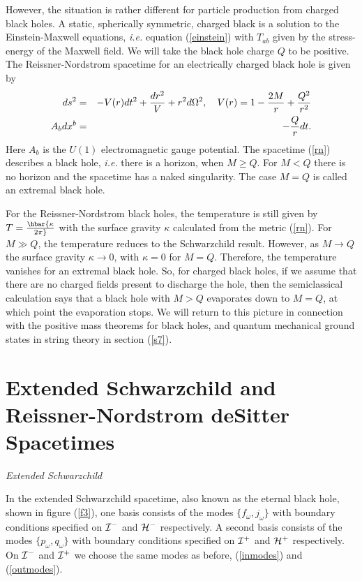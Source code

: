 \documentclass[12pt]{article}
\newcommand{\p}{\partial}
\def\bena{\begin{eqnarray}}
\def\eena{\end{eqnarray}}
\def\fh{{\cal H}^+}
\def\ph{{\cal H}^-}
\def\finf{{\cal I}^+}
\def\pinf{{\cal I}^-}
\def\f{f_{\omega}}
\def\p{p_{\omega}}
\def\q{q_{\omega}}
\def\j{j_{\omega}}
\begin{document}
However, the situation is rather different for particle production
from charged black holes. A static, spherically symmetric, charged black is a
solution to the Einstein-Maxwell equations, {\it i.e.} equation
(\ref{einstein}) with $T_{ab}$ given by the
stress-energy of the Maxwell field.
We will take the black hole
charge $Q$ to be positive.  The Reissner-Nordstrom spacetime for an
electrically charged
black hole is given by
%
\bena\label{rn} ds^2  &= &-V(r)dt^2 +{dr^2 \over V} +r^2 d\Omega ^2,
\quad V(r) = 1-{2M\over r} +{Q^2 \over r^2}  \\
A_b dx^b &=&-{Q\over r}dt .\eena
%
Here $A_b$ is the $U(1)$ electromagnetic gauge potential. The spacetime
(\ref{rn})  describes
a black hole, {\it i.e.} there is a horizon, when $M\ge Q$.  For $M<Q$
there is no
horizon and the spacetime has a naked singularity. The case $M=Q$
is called an extremal black hole.

For the Reissner-Nordstrom black holes, the temperature is still given by
$T=\hbar
{\kappa\over 2\pi}$ with the surface gravity $\kappa$ calculated from the
metric (\ref{rn}).
For $M\gg Q$, the
temperature reduces to the Schwarzchild result.  However, as $M\rightarrow
Q $ the surface
gravity  $\kappa\rightarrow 0$, with $\kappa =0$ for $M=Q$.
Therefore, the temperature vanishes for an extremal black hole. So, for
charged black holes, if we assume that
there are no charged fields present to discharge the hole, then the
semiclassical calculation says
that a black hole with $M>Q$ evaporates down to $M=Q$, at which point the
evaporation stops.
We will return to this picture in connection with the positive mass
theorems for black
holes, and quantum mechanical ground states in  string theory in section (\ref{s7}).

\section{Extended Schwarzchild and Reissner-Nordstrom deSitter Spacetimes}
\label{section6}

\vskip 0.1in\noindent
{\it Extended Schwarzchild}
\vskip 0.05in

In the extended Schwarzchild spacetime, also known as the eternal black hole,
shown in figure (\ref{f3}), one basis
consists of the modes $\{\f,\j\}$ with boundary conditions specified on
$\pinf$ and $\ph$ respectively.  A
second basis consists of the modes $\{ \p ,\q \}$ with boundary conditions
specified on
$\finf$ and $\fh$ respectively.  On $\pinf$ and $\finf$ we choose the
same modes as before, (\ref{inmodes}) and (\ref{outmodes}).
\end{document}

